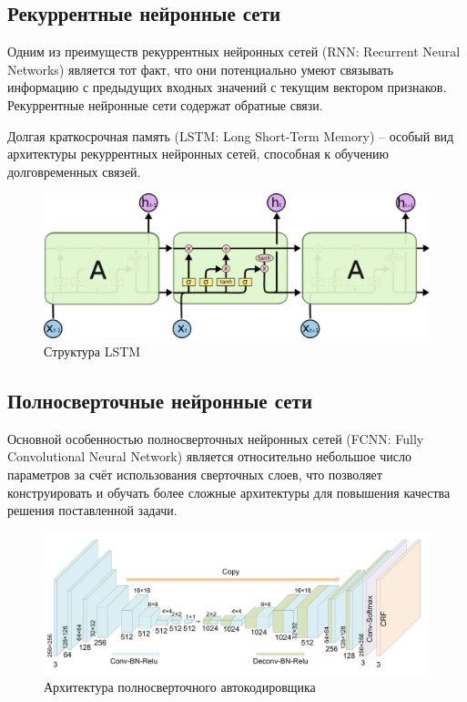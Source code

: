 \documentclass[12pt]{article}
\begin{document}
    \subsection{Рекуррентные нейронные сети}
    \label{sec:Future:LSTM}

    \par Одним из преимуществ рекуррентных нейронных сетей (RNN: Recurrent Neural Networks) является тот факт, что они потенциально умеют связывать информацию с предыдущих входных значений с текущим вектором признаков. Рекуррентные нейронные сети содержат обратные связи. \\

    \par Долгая краткосрочная память (LSTM: Long Short-Term Memory) \cite{LSTM} – особый вид архитектуры рекуррентных нейронных сетей, способная к обучению долговременных связей.

    \begin{figure}[h]
        \centering
        \includegraphics[width=0.9\linewidth]{LSTM.png}
        \caption{Структура LSTM}
        \label{sec:Future:LSTM:fig:LSTM}
    \end{figure}


    \subsection{Полносверточные нейронные сети}
    \label{sec:Future:FCNN}

    \par Основной особенностью полносверточных нейронных сетей (FCNN: Fully Convolutional Neural Network) является относительно небольшое число параметров за счёт использования сверточных слоев, что позволяет конструировать и обучать более сложные архитектуры для повышения качества решения поставленной задачи.

    \begin{figure}[h]
        \centering
        \includegraphics[width=0.9\linewidth]{FCNN.png}
        \caption{Архитектура полносверточного автокодировщика}
        \label{sec:Future:FCNN:fig:FCNN}
    \end{figure}
\end{document}
